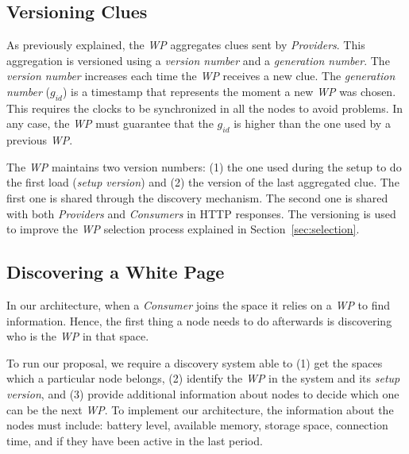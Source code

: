 \subsection{Versioning Clues}
As previously explained, the \emph{WP} aggregates clues sent by \emph{Providers}.
This aggregation is versioned using a \emph{version number} and a \emph{generation number}.
The \emph{version number} increases each time the \emph{WP} receives a new clue.
The \emph{generation number} ($g_{id}$) is a timestamp that represents the moment a new \emph{WP} was chosen.
This requires the clocks to be synchronized in all the nodes to avoid problems.
In any case, the \emph{WP} must guarantee that the $g_{id}$ is higher than the one used by a previous \emph{WP}.

The \emph{WP} maintains two version numbers:
(1) the one used during the setup to do the first load (\emph{setup version}) and
(2) the version of the last aggregated clue.
The first one is shared through the discovery mechanism.
The second one is shared with both \emph{Providers} and \emph{Consumers} in HTTP responses.
The versioning is used to improve the \emph{WP} selection process explained in Section~\ref{sec:selection}.


\subsection{Discovering a White Page}
In our architecture, when a \emph{Consumer} joins the space it relies on a \emph{WP} to find information.
Hence, the first thing a node needs to do afterwards is discovering who is the \emph{WP} in that space.

To run our proposal, we require a discovery system able to
(1) get the spaces which a particular node belongs,
(2) identify the \emph{WP} in the system and its \emph{setup version}, and
(3) provide additional information about nodes to decide which one can be the next \emph{WP}.
To implement our architecture, the information about the nodes must include:
battery level, available memory, storage space, connection time, and if they have been active in the last period.

